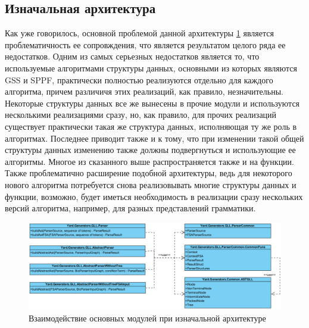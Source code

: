 \documentclass[14pt]{matmex-diploma}
\begin{document}
\subsection{Изначальная архитектура}
Как уже говорилось, основной проблемой данной архитектуры \ref{fig:Old} является проблематичность ее сопровждения, что является результатом целого ряда ее недостатков. Одним из самых серьезных недостатков является то, что используемые алгоритмами структуры данных, основными из которых являются GSS и SPPF, практически полностью реализуются отдельно для каждого алгоритма, причем различичя этих реализаций, как правило, незначительны. Некоторые структуры данных все же вынесены в прочие модули и используются несколькими реализациями сразу, но, как правило, для прочих реализаций существует практически такая же структура данных, исполняющая ту же роль в алгоритмах. Последнее приводит также и к тому, что при изменении такой общей структуры данных изменению также должны подвергнуться и использующие ее алгоритмы. Многое из сказанного выше распространяется также и на функции. 
Также проблематично расширение подобной архитектуры, ведь для некоторого нового алгоритма потребуется снова реализовывать многие структуры данных и функции, возможно, будет иметься необходимость в реализации сразу нескольких версий алгоритма, например, для разных представлений грамматики.
\begin{figure}[h]
    \includegraphics[width=\textwidth]{images/Old}
    \caption{Взаимодействие основных модулей при изначальной архитектуре}
    \label{fig:Old}
\end{figure}
\end{document}
